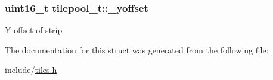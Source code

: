 \subsubsection[{\texorpdfstring{\+\_\+yoffset}{\_yoffset}}]{\setlength{\rightskip}{0pt plus 5cm}uint16\+\_\+t tilepool\+\_\+t\+::\+\_\+yoffset}\hypertarget{structtilepool__t_a3d49b78c34fd815960055061dc4e3086}{}\label{structtilepool__t_a3d49b78c34fd815960055061dc4e3086}
Y offset of strip 

The documentation for this struct was generated from the following file\+:\begin{DoxyCompactItemize}
\item 
include/\hyperlink{tiles_8h}{tiles.\+h}\end{DoxyCompactItemize}
